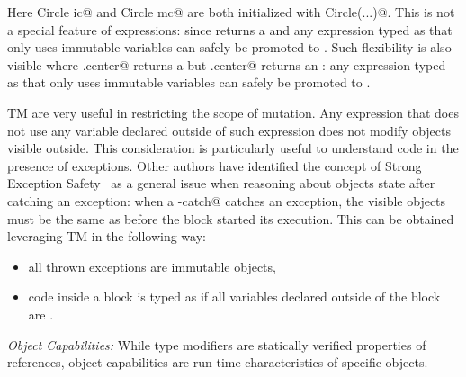 Here \Q@imm Circle ic@ and \Q@mut Circle mc@ are both initialized with \Q@new Circle(...)@.
This is not a special feature of \Q@new@ expressions: since \Q@new@ returns a \Q@mut@ and any expression typed as \Q@mut@ that only uses immutable variables can safely be promoted to \Q@imm@.
Such flexibility is also visible where \Q@rc.center@ returns a \Q@read@ but \Q@ic.center@ returns an \Q@imm@: any expression typed as \Q@read@ that only
uses immutable variables can safely be promoted to \Q@imm@.






\loseSpace

TM are very useful in restricting the scope of mutation. 
Any expression that does not use any \Q@mut@ 
variable declared outside of such expression does not modify objects visible outside. This consideration is particularly useful to understand code in the presence of exceptions. Other authors have identified the concept of Strong Exception Safety~\cite{Abrahams2000} as a general issue when reasoning about objects state after catching an exception:
when a \Q@try-catch@ catches an exception, the visible objects must be the same as before the \Q@try@ block started its execution.
This can be obtained leveraging TM in the following way:
\begin{itemize}
\item all thrown exceptions are immutable objects,
\item code inside a \Q@try@ block is typed as if all \Q@mut@ variables declared outside of the block are \Q@read@.
\end{itemize}

\loseSpace
\noindent\textit{Object Capabilities:}
While type modifiers are statically verified properties of references, object capabilities are run time characteristics of specific objects.

